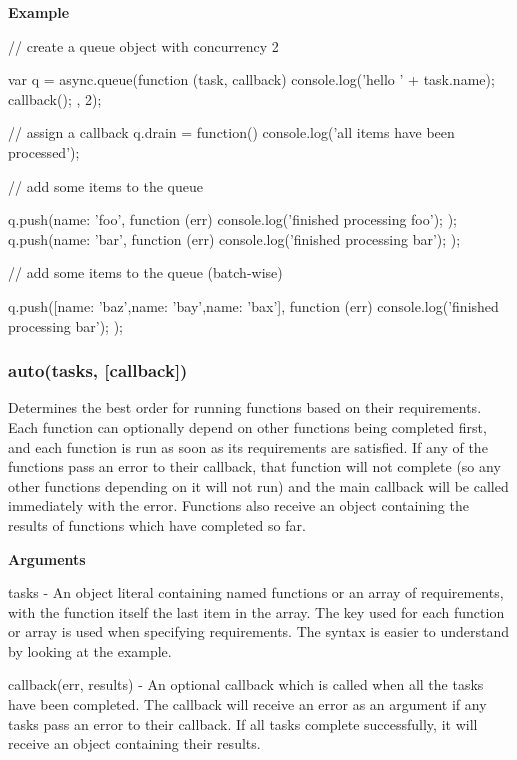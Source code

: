 {\bfseries Example} \begin{DoxyVerb}// create a queue object with concurrency 2

var q = async.queue(function (task, callback) {
    console.log('hello ' + task.name);
    callback();
}, 2);


// assign a callback
q.drain = function() {
    console.log('all items have been processed');
}

// add some items to the queue

q.push({name: 'foo'}, function (err) {
    console.log('finished processing foo');
});
q.push({name: 'bar'}, function (err) {
    console.log('finished processing bar');
});

// add some items to the queue (batch-wise)

q.push([{name: 'baz'},{name: 'bay'},{name: 'bax'}], function (err) {
    console.log('finished processing bar');
});
\end{DoxyVerb}






\label{_auto}%
 \subsubsection*{auto(tasks, \mbox{[}callback\mbox{]})}

Determines the best order for running functions based on their requirements. Each function can optionally depend on other functions being completed first, and each function is run as soon as its requirements are satisfied. If any of the functions pass an error to their callback, that function will not complete (so any other functions depending on it will not run) and the main callback will be called immediately with the error. Functions also receive an object containing the results of functions which have completed so far.

{\bfseries Arguments}


\begin{DoxyItemize}
\item tasks -\/ An object literal containing named functions or an array of requirements, with the function itself the last item in the array. The key used for each function or array is used when specifying requirements. The syntax is easier to understand by looking at the example.
\item callback(err, results) -\/ An optional callback which is called when all the tasks have been completed. The callback will receive an error as an argument if any tasks pass an error to their callback. If all tasks complete successfully, it will receive an object containing their results.
\end{DoxyItemize}

